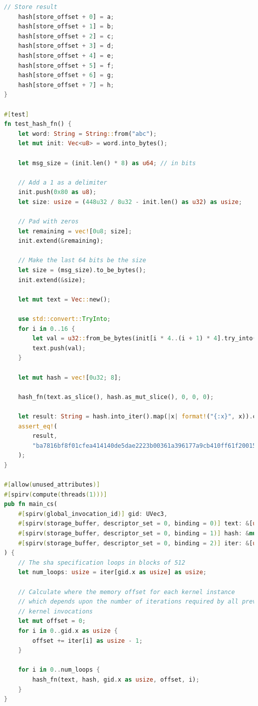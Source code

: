 \documentclass{article}
\begin{document}
\begin{lstlisting}[language=Rust, style=boxed]
    // Store result
    hash[store_offset + 0] = a;
    hash[store_offset + 1] = b;
    hash[store_offset + 2] = c;
    hash[store_offset + 3] = d;
    hash[store_offset + 4] = e;
    hash[store_offset + 5] = f;
    hash[store_offset + 6] = g;
    hash[store_offset + 7] = h;
}

#[test]
fn test_hash_fn() {
    let word: String = String::from("abc");
    let mut init: Vec<u8> = word.into_bytes();

    let msg_size = (init.len() * 8) as u64; // in bits

    // Add a 1 as a delimiter
    init.push(0x80 as u8);
    let size: usize = (448u32 / 8u32 - init.len() as u32) as usize;

    // Pad with zeros
    let remaining = vec![0u8; size];
    init.extend(&remaining);

    // Make the last 64 bits be the size
    let size = (msg_size).to_be_bytes();
    init.extend(&size);

    let mut text = Vec::new();

    use std::convert::TryInto;
    for i in 0..16 {
        let val = u32::from_be_bytes(init[i * 4..(i + 1) * 4].try_into().unwrap());
        text.push(val);
    }

    let mut hash = vec![0u32; 8];

    hash_fn(text.as_slice(), hash.as_mut_slice(), 0, 0, 0);

    let result: String = hash.into_iter().map(|x| format!("{:x}", x)).collect();
    assert_eq!(
        result,
        "ba7816bf8f01cfea414140de5dae2223b00361a396177a9cb410ff61f20015ad"
    );
}

#[allow(unused_attributes)]
#[spirv(compute(threads(1)))]
pub fn main_cs(
    #[spirv(global_invocation_id)] gid: UVec3,
    #[spirv(storage_buffer, descriptor_set = 0, binding = 0)] text: &[u32],
    #[spirv(storage_buffer, descriptor_set = 0, binding = 1)] hash: &mut [u32],
    #[spirv(storage_buffer, descriptor_set = 0, binding = 2)] iter: &[u32],
) {
    // The sha specification loops in blocks of 512
    let num_loops: usize = iter[gid.x as usize] as usize;

    // Calculate where the memory offset for each kernel instance
    // which depends upon the number of iterations required by all previous
    // kernel invocations
    let mut offset = 0;
    for i in 0..gid.x as usize {
        offset += iter[i] as usize - 1;
    }

    for i in 0..num_loops {
        hash_fn(text, hash, gid.x as usize, offset, i);
    }
}

\end{lstlisting}
\end{document}
